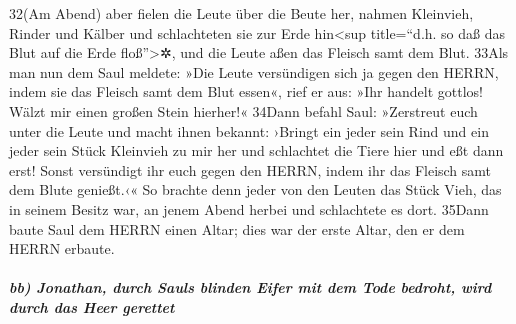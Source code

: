 32(Am Abend) aber fielen die Leute über die Beute her, nahmen Kleinvieh,
Rinder und Kälber und schlachteten sie zur Erde hin\textless sup
title=``d.h. so daß das Blut auf die Erde floß''\textgreater✲, und die
Leute aßen das Fleisch samt dem Blut. 33Als man nun dem Saul meldete:
»Die Leute versündigen sich ja gegen den HERRN, indem sie das Fleisch
samt dem Blut essen«, rief er aus: »Ihr handelt gottlos! Wälzt mir einen
großen Stein hierher!« 34Dann befahl Saul: »Zerstreut euch unter die
Leute und macht ihnen bekannt: ›Bringt ein jeder sein Rind und ein jeder
sein Stück Kleinvieh zu mir her und schlachtet die Tiere hier und eßt
dann erst! Sonst versündigt ihr euch gegen den HERRN, indem ihr das
Fleisch samt dem Blute genießt.‹« So brachte denn jeder von den Leuten
das Stück Vieh, das in seinem Besitz war, an jenem Abend herbei und
schlachtete es dort. 35Dann baute Saul dem HERRN einen Altar; dies war
der erste Altar, den er dem HERRN erbaute.

\hypertarget{bb-jonathan-durch-sauls-blinden-eifer-mit-dem-tode-bedroht-wird-durch-das-heer-gerettet}{%
\subparagraph{bb) Jonathan, durch Sauls blinden Eifer mit dem Tode
bedroht, wird durch das Heer
gerettet}\label{bb-jonathan-durch-sauls-blinden-eifer-mit-dem-tode-bedroht-wird-durch-das-heer-gerettet}}

